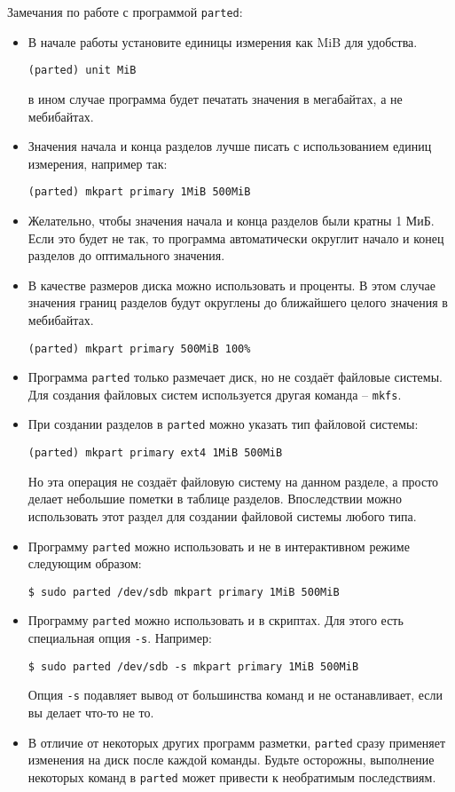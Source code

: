 \documentclass[10pt]{article}
\begin{document}
\noindent Замечания по работе с программой \texttt{parted}:
\begin{itemize}
\item В начале работы установите единицы измерения как MiB для удобства.
\begin{lstlisting}
(parted) unit MiB
\end{lstlisting}
в ином случае программа будет печатать значения в мегабайтах, а не мебибайтах.

\item Значения начала и конца разделов лучше писать с использованием единиц измерения, например так:
\begin{lstlisting}
(parted) mkpart primary 1MiB 500MiB
\end{lstlisting}

\item Желательно, чтобы значения начала и конца разделов были кратны 1 МиБ. Если это будет не так, то программа автоматически округлит начало и конец разделов до оптимального значения.


\item В качестве размеров диска можно использовать и проценты. В этом случае значения границ разделов будут округлены до ближайшего целого значения в мебибайтах.
\begin{lstlisting}
(parted) mkpart primary 500MiB 100%
\end{lstlisting}

\item Программа \texttt{parted} только размечает диск, но не создаёт файловые системы. Для создания файловых систем используется другая команда -- \texttt{mkfs}.
\item При создании разделов в \texttt{parted} можно указать тип файловой системы:
\begin{lstlisting}
(parted) mkpart primary ext4 1MiB 500MiB
\end{lstlisting}
Но эта операция не создаёт файловую систему на данном разделе, а просто делает небольшие пометки в таблице разделов. Впоследствии можно использовать этот раздел для создании файловой системы любого типа.
\item Программу \texttt{parted} можно использовать и не в интерактивном режиме следующим образом:
\begin{lstlisting}
$ sudo parted /dev/sdb mkpart primary 1MiB 500MiB
\end{lstlisting}

\item Программу \texttt{parted} можно использовать и в скриптах. Для этого есть специальная опция \texttt{-s}. Например:
\begin{lstlisting}
$ sudo parted /dev/sdb -s mkpart primary 1MiB 500MiB
\end{lstlisting}
Опция \texttt{-s} подавляет вывод от большинства команд и не останавливает, если вы делает что-то не то.

\item В отличие от некоторых других программ разметки, \texttt{parted} сразу применяет изменения на диск после каждой команды. Будьте осторожны, выполнение некоторых команд в \texttt{parted} может привести к необратимым последствиям.

\end{itemize}
\end{document}

